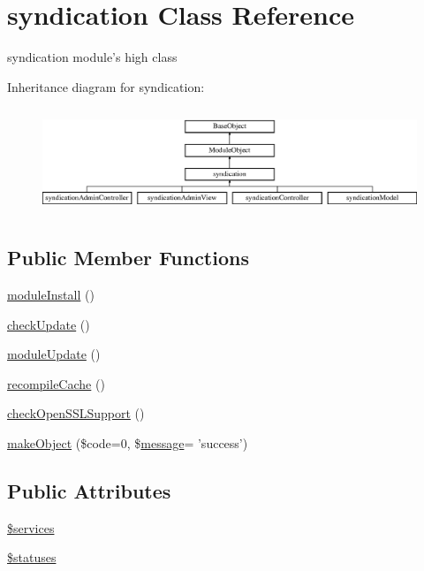 \hypertarget{classsyndication}{\section{syndication Class Reference}
\label{classsyndication}
}


syndication module's high class  


Inheritance diagram for syndication\-:\begin{figure}[H]
\begin{center}
\leavevmode
\includegraphics[height=3.200000cm]{classsyndication}
\end{center}
\end{figure}
\subsection*{Public Member Functions}
\begin{DoxyCompactItemize}
\item 
\hyperlink{classsyndication_a3ac805dcd1107f4e2a6f93209d205e84}{module\-Install} ()
\item 
\hyperlink{classsyndication_a1958abafb6c5af837ee281a3ca978ced}{check\-Update} ()
\item 
\hyperlink{classsyndication_a9a21e03069b4b1d2a358782164945fd7}{module\-Update} ()
\item 
\hyperlink{classsyndication_afd896ebb831df6ba163db3dba6284c48}{recompile\-Cache} ()
\item 
\hyperlink{classsyndication_ad273800353362cb8a6309ce6c0836488}{check\-Open\-S\-S\-L\-Support} ()
\item 
\hyperlink{classsyndication_abccc21e1c4b6fb98eb55b939624c11e6}{make\-Object} (\$code=0, \$\hyperlink{classmessage}{message}= 'success')
\end{DoxyCompactItemize}
\subsection*{Public Attributes}
\begin{DoxyCompactItemize}
\item 
\hyperlink{classsyndication_af06964ce2dfdb41ac75bfd118f33c53a}{\$services}
\item 
\hyperlink{classsyndication_aa175d9feff79c15744edb77367bee942}{\$statuses}
\end{DoxyCompactItemize}


